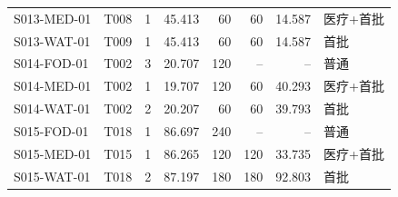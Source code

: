 \begin{longtable}{@{}llrrrrrl@{}}
S013-MED-01 & T008 & 1 & 45.413 & 60 & 60 & 14.587 & 医疗+首批 \\
S013-WAT-01 & T009 & 1 & 45.413 & 60 & 60 & 14.587 & 首批 \\
S014-FOD-01 & T002 & 3 & 20.707 & 120 & -- & -- & 普通 \\
S014-MED-01 & T002 & 1 & 19.707 & 120 & 60 & 40.293 & 医疗+首批 \\
S014-WAT-01 & T002 & 2 & 20.207 & 60 & 60 & 39.793 & 首批 \\
S015-FOD-01 & T018 & 1 & 86.697 & 240 & -- & -- & 普通 \\
S015-MED-01 & T015 & 1 & 86.265 & 120 & 120 & 33.735 & 医疗+首批 \\
S015-WAT-01 & T018 & 2 & 87.197 & 180 & 180 & 92.803 & 首批 \\
\end{longtable}
\endgroup
